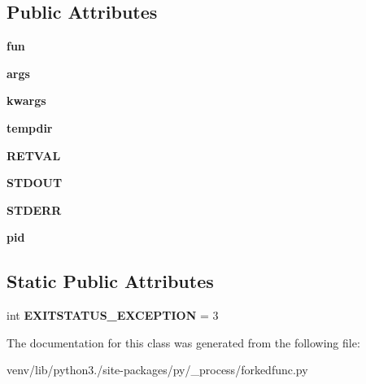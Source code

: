 \subsection*{Public Attributes}
\begin{DoxyCompactItemize}
\item 
\mbox{\label{classpy_1_1__process_1_1forkedfunc_1_1_forked_func_a046ab1a92f0829a2b19ee2a8ff482bcd}} 
{\bfseries fun}
\item 
\mbox{\label{classpy_1_1__process_1_1forkedfunc_1_1_forked_func_a89250baee8956ad3b853f3c89e9cf896}} 
{\bfseries args}
\item 
\mbox{\label{classpy_1_1__process_1_1forkedfunc_1_1_forked_func_a2a49872c4e9761bbf8a30021be225e09}} 
{\bfseries kwargs}
\item 
\mbox{\label{classpy_1_1__process_1_1forkedfunc_1_1_forked_func_aff51e032892e75ace5efb5aac4dbc2e4}} 
{\bfseries tempdir}
\item 
\mbox{\label{classpy_1_1__process_1_1forkedfunc_1_1_forked_func_a2044a1a070a1ae47cbea283da8cef4a0}} 
{\bfseries R\+E\+T\+V\+AL}
\item 
\mbox{\label{classpy_1_1__process_1_1forkedfunc_1_1_forked_func_ae982655d36b6a4ed0e0254254f189b10}} 
{\bfseries S\+T\+D\+O\+UT}
\item 
\mbox{\label{classpy_1_1__process_1_1forkedfunc_1_1_forked_func_a108ab058d0f2f05a40414f2704df9e7a}} 
{\bfseries S\+T\+D\+E\+RR}
\item 
\mbox{\label{classpy_1_1__process_1_1forkedfunc_1_1_forked_func_ae95635c3ce2d03814468ca980f0b8612}} 
{\bfseries pid}
\end{DoxyCompactItemize}
\subsection*{Static Public Attributes}
\begin{DoxyCompactItemize}
\item 
\mbox{\label{classpy_1_1__process_1_1forkedfunc_1_1_forked_func_aa1226649d78845f574656e6b422fd771}} 
int {\bfseries E\+X\+I\+T\+S\+T\+A\+T\+U\+S\+\_\+\+E\+X\+C\+E\+P\+T\+I\+ON} = 3
\end{DoxyCompactItemize}


The documentation for this class was generated from the following file\+:\begin{DoxyCompactItemize}
\item 
venv/lib/python3./site-\/packages/py/\+\_\+process/forkedfunc.\+py\end{DoxyCompactItemize}
